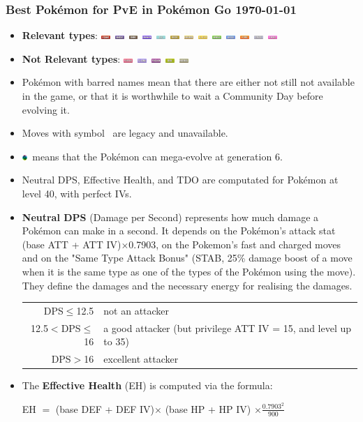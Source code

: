 \documentclass[8pt,aspectratio=169,compress]{beamer}
\newcommand{\fightingfull}{\includegraphics[height=0.15cm]{../../images/type/full/Fighting.png}}
\newcommand{\bugfull}{\includegraphics[height=0.15cm]{../../images/type/full/Bug.png}}
\newcommand{\darkfull}{\includegraphics[height=0.15cm]{../../images/type/full/Dark.png}}
\newcommand{\electricfull}{\includegraphics[height=0.15cm]{../../images/type/full/Electric.png}}
\newcommand{\fairyfull}{\includegraphics[height=0.15cm]{../../images/type/full/Fairy.png}}
\newcommand{\firefull}{\includegraphics[height=0.15cm]{../../images/type/full/Fire.png}}
\newcommand{\flyingfull}{\includegraphics[height=0.15cm]{../../images/type/full/Flying.png}}
\newcommand{\ghostfull}{\includegraphics[height=0.15cm]{../../images/type/full/Ghost.png}}
\newcommand{\dragonfull}{\includegraphics[height=0.15cm]{../../images/type/full/Dragon.png}}
\newcommand{\grassfull}{\includegraphics[height=0.15cm]{../../images/type/full/Grass.png}}
\newcommand{\groundfull}{\includegraphics[height=0.15cm]{../../images/type/full/Ground.png}}
\newcommand{\icefull}{\includegraphics[height=0.15cm]{../../images/type/full/Ice.png}}
\newcommand{\normalfull}{\includegraphics[height=0.15cm]{../../images/type/full/Normal.png}}
\newcommand{\psychicfull}{\includegraphics[height=0.15cm]{../../images/type/full/Psychic.png}}
\newcommand{\rockfull}{\includegraphics[height=0.15cm]{../../images/type/full/Rock.png}}
\newcommand{\waterfull}{\includegraphics[height=0.15cm]{../../images/type/full/Water.png}}
\newcommand{\poisonfull}{\includegraphics[height=0.15cm]{../../images/type/full/Poison.png}}
\newcommand{\steelfull}{\includegraphics[height=0.15cm]{../../images/type/full/Steel.png}}
\newcommand{\megaevol}{\includegraphics[width=0.2cm]{../../images/megaevolve}}
\begin{document}
\begin{frame}
\frametitle{Best Pok\'emon for PvE in Pok\'emon Go \hspace{8cm} \today}

\begin{block}{}
\begin{tiny}
\begin{itemize}
  \item \textbf{Relevant types}: \fightingfull ~\ghostfull ~\darkfull ~\dragonfull ~\icefull ~\rockfull ~\groundfull ~\electricfull ~\grassfull ~\waterfull ~\firefull ~\steelfull ~\fairyfull 
 \item \textbf{Not Relevant types}:  \psychicfull ~\flyingfull ~\poisonfull ~\bugfull ~\normalfull
  \item Pok\'emon with barred names mean that there are either not still not available in the game, or that it is worthwhile to wait a Community Day before evolving it.
  \item Moves with symbol \dag~are legacy and unavailable.
  \item \megaevol~means that the Pok\'emon can mega-evolve at generation 6.
  \item Neutral DPS, Effective Health, and TDO are computated for Pok\'emon at level 40, with perfect IVs. 
  \item \textbf{Neutral DPS} (Damage per Second) represents how much damage a Pok\'emon can make in a second. It depends on the Pok\'emon's attack stat (base ATT + ATT IV)$\times$0.7903, on the Pokemon's fast and charged moves and on the "Same Type Attack Bonus" (STAB, 25\% damage boost of a move when it is the same type as one of the types of the Pokémon using the move). They define the damages and the necessary energy for realising the damages.
\begin{center}
\begin{tabular}{rl}
DPS$\leq$12.5   &  not an attacker  \\
12.5$<$DPS$\leq$16   &  a good attacker (but privilege ATT IV = 15, and level up to 35)  \\
DPS$>$16   &  excellent attacker  \\
\end{tabular}
\end{center}
  \item The \textbf{Effective Health} (EH) is computed via the formula:
\begin{center}
EH $=$ (base DEF + DEF IV)$\times$ (base HP + HP IV) $\times \frac{0.7903^2}{900}$
\end{center}

\end{itemize}
\end{tiny}
\end{block}
\end{frame}
\end{document}
